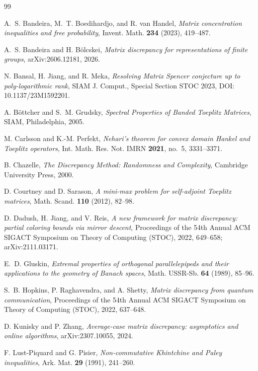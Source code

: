 \documentclass[11pt]{amsart}
\numberwithin{equation}{section}
\theoremstyle{definition}
\theoremstyle{remark}
\begin{document}
\begin{thebibliography}{99}

A.~S. Bandeira, M.~T. Boedihardjo, and R. van Handel,
\emph{Matrix concentration inequalities and free probability},
Invent. Math. \textbf{234} (2023), 419--487.

A.~S. Bandeira and H. B\"olcskei,
\emph{Matrix discrepancy for representations of finite groups},
arXiv:2606.12181, 2026.

N. Bansal, H. Jiang, and R. Meka,
\emph{Resolving Matrix Spencer conjecture up to poly-logarithmic rank},
SIAM J. Comput., Special Section STOC 2023,
DOI: 10.1137/23M1592201.

A. B\"ottcher and S.~M. Grudsky,
\emph{Spectral Properties of Banded Toeplitz Matrices},
SIAM, Philadelphia, 2005.

M. Carlsson and K.-M. Perfekt,
\emph{Nehari's theorem for convex domain Hankel and Toeplitz operators},
Int. Math. Res. Not. IMRN \textbf{2021}, no.~5, 3331--3371.

B. Chazelle,
\emph{The Discrepancy Method: Randomness and Complexity},
Cambridge University Press, 2000.

D. Courtney and D. Sarason,
\emph{A mini-max problem for self-adjoint Toeplitz matrices},
Math. Scand. \textbf{110} (2012), 82--98.

D. Dadush, H. Jiang, and V. Reis,
\emph{A new framework for matrix discrepancy: partial coloring bounds via mirror descent},
Proceedings of the 54th Annual ACM SIGACT Symposium on Theory of Computing
(STOC), 2022, 649--658; arXiv:2111.03171.

E.~D. Gluskin,
\emph{Extremal properties of orthogonal parallelepipeds and their applications to the geometry of Banach spaces},
Math. USSR-Sb. \textbf{64} (1989), 85--96.

S.~B. Hopkins, P. Raghavendra, and A. Shetty,
\emph{Matrix discrepancy from quantum communication},
Proceedings of the 54th Annual ACM SIGACT Symposium on Theory of Computing
(STOC), 2022, 637--648.

D. Kunisky and P. Zhang,
\emph{Average-case matrix discrepancy: asymptotics and online algorithms},
arXiv:2307.10055, 2024.

F. Lust-Piquard and G. Pisier,
\emph{Non-commutative Khintchine and Paley inequalities},
Ark. Mat. \textbf{29} (1991), 241--260.


\end{thebibliography}
\end{document}
